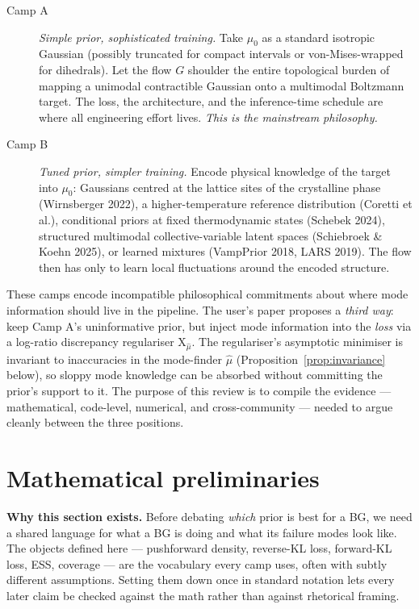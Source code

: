 \documentclass[11pt,letterpaper]{article}
\newcommand{\Xfun}{\mathrm{X}}
\theoremstyle{plain}
\begin{document}
\begin{description}
  \item[Camp A] \emph{Simple prior, sophisticated training.} Take $\mu_0$ as a
    standard isotropic Gaussian (possibly truncated for compact intervals or
    von-Mises-wrapped for dihedrals). Let the flow $G$ shoulder the entire
    topological burden of mapping a unimodal contractible Gaussian onto a
    multimodal Boltzmann target. The loss, the architecture, and the inference-time
    schedule are where all engineering effort lives. \emph{This is the mainstream
    philosophy.}
  \item[Camp B] \emph{Tuned prior, simpler training.} Encode physical knowledge of
    the target into $\mu_0$: Gaussians centred at the lattice sites of the
    crystalline phase (Wirnsberger 2022), a higher-temperature reference distribution
    (Coretti et al.), conditional priors at fixed thermodynamic states (Schebek 2024),
    structured multimodal collective-variable latent spaces (Schiebroek \& Koehn 2025),
    or learned mixtures (VampPrior 2018, LARS 2019). The flow then has only to
    learn local fluctuations around the encoded structure.
\end{description}

These camps encode incompatible philosophical commitments about where mode
information should live in the pipeline. The user's paper proposes a \emph{third
way}: keep Camp A's uninformative prior, but inject mode information into the
\emph{loss} via a log-ratio discrepancy regulariser $\Xfun_{\hat\mu}$. The regulariser's
asymptotic minimiser is invariant to inaccuracies in the mode-finder $\hat\mu$
(Proposition~\ref{prop:invariance} below), so sloppy mode knowledge can be absorbed
without committing the prior's support to it. The purpose of this review is to
compile the evidence --- mathematical, code-level, numerical, and cross-community
--- needed to argue cleanly between the three positions.

\section{Mathematical preliminaries}

\begin{callout}
\textbf{Why this section exists.} Before debating \emph{which} prior is best for a
BG, we need a shared language for what a BG is doing and what its failure modes
look like. The objects defined here --- pushforward density, reverse-KL loss,
forward-KL loss, ESS, coverage --- are the vocabulary every camp uses, often with
subtly different assumptions. Setting them down once in standard notation lets
every later claim be checked against the math rather than against rhetorical
framing.
\end{callout}
\end{document}
